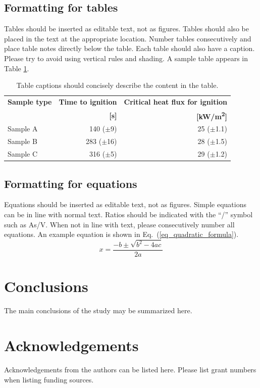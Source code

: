 \documentclass[fleqn,letterpaper,12pt]{article}
\begin{document}
\subsection{Formatting for tables}

Tables should be inserted as editable text, not as figures.  Tables should also be placed in the text at the appropriate location.  Number tables consecutively and place table notes directly below the table.  Each table should also have a caption.  Please try to avoid using vertical rules and shading. A sample table appears in Table \ref{example_table}.

\begin{table}[h!]
\begin{minipage}{.9\textwidth}
\renewcommand*\footnoterule{}
\renewcommand{\thefootnote}{\alph{footnote}}
\renewcommand*{\arraystretch}{1.4}
\caption{Table captions should concisely describe the content in the table.}
\small
\begin{tabular}{|l|r|r|}
\hline
{\bf Sample type}  & {\bf Time to ignition}  & {\bf Critical heat flux for ignition} \\
                   & {\bf[s]}            & {\bf [\si{kW/m^2}]} \\ \hline   
Sample A           & 140 ($\pm$9)   &  25 ($\pm$1.1)  \\ \hline
Sample B           & 283 ($\pm$16)  &  28 ($\pm$1.5)  \\ \hline
Sample C           & 316 ($\pm$5)   &  29 ($\pm$1.2)  \\ \hline
\end{tabular}
\label{example_table}
\end{minipage}
\end{table}

\subsection{Formatting for equations}

Equations should be inserted as editable text, not as figures.  Simple equations can be in line with normal text.  Ratios should be indicated with the “/” symbol such as As/V.  When not in line with text, please consecutively number all equations.  An example equation is shown in Eq.~(\ref{eq_quadratic_formula}).
\begin{equation}
\label{eq_quadratic_formula}
x = \frac{-b \pm \sqrt{b^2-4ac}}{2a}
\end{equation}

\section{Conclusions}

The main conclusions of the study may be summarized here.

\section*{Acknowledgements}

Acknowledgements from the authors can be listed here.  Please list grant numbers when listing funding sources.



\end{document}
